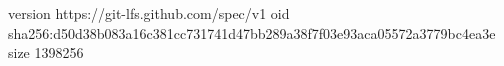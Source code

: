 version https://git-lfs.github.com/spec/v1
oid sha256:d50d38b083a16c381cc731741d47bb289a38f7f03e93aca05572a3779bc4ea3e
size 1398256
